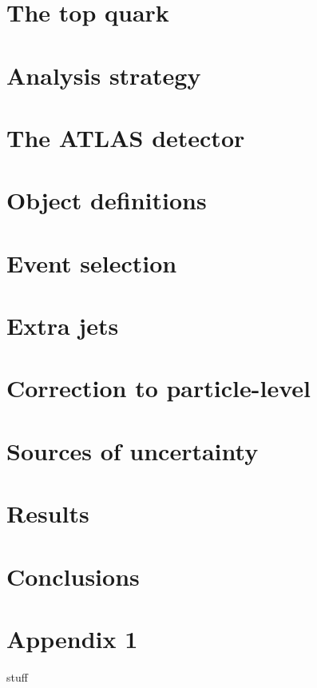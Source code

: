 \documentclass[12pt]{ucthesis}
\begin{document}
\chapter{The top quark}
\label{ch:theory}

\chapter{Analysis strategy}
\label{ch:strategy}

\chapter{The ATLAS detector}
\label{ch:atlas}

\chapter{Object definitions}
\label{ch:objects}

\chapter{Event selection}
\label{ch:event}

\chapter{Extra jets}
\label{ch:extrajets}

\chapter{Correction to particle-level}
\label{ch:unfolding}

\chapter{Sources of uncertainty}
\label{ch:uncert}

\chapter{Results}
\label{ch:results}

\chapter{Conclusions}
\label{ch:conclusions}

\appendix
\chapter{Appendix 1}
stuff




\end{document}
